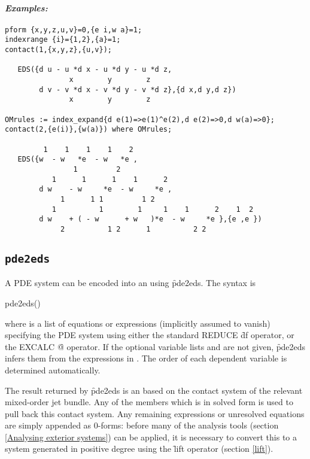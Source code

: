 \paragraph{\it Examples:}
\begin{verbatim}
pform {x,y,z,u,v}=0,{e i,w a}=1;
indexrange {i}={1,2},{a}=1;
contact(1,{x,y,z},{u,v});

   EDS({d u - u *d x - u *d y - u *d z,
               x        y        z 
        d v - v *d x - v *d y - v *d z},{d x,d y,d z})
               x        y        z 

OMrules := index_expand{d e(1)=>e(1)^e(2),d e(2)=>0,d w(a)=>0}; 
contact(2,{e(i)},{w(a)}) where OMrules;

         1    1    1    1    2
   EDS({w  - w   *e  - w   *e ,
                1         2 
           1      1      1    1      2
        d w    - w     *e  - w     *e ,
             1      1 1         1 2 
           1          1        1     1    1      2    1  2
        d w    + ( - w      + w   )*e  - w     *e },{e ,e })
             2          1 2      1          2 2 
\end{verbatim}

\subsection{\tt pde2eds}
\label{pde2eds}

A PDE system can be encoded into an  using \f{pde2eds}. The
syntax is
\begin{syntax}
	pde2eds()
\end{syntax}
where  is a list of equations or expressions (implicitly assumed
to vanish) specifying the PDE system using either
the standard REDUCE \f{df} operator, or the EXCALC \f{@} operator. If the
optional variable lists  and  are not
given, \f{pde2eds} infers them from the expressions in . The
order of each dependent variable is determined automatically.

The result returned by \f{pde2eds} is an  based on the contact
system of the relevant mixed-order jet bundle. Any of the 
members which is in solved form is used to pull back this contact
system. Any remaining expressions or unresolved equations are simply
appended as 0-forms: before many of the analysis tools (section
\ref{Analysing exterior systems}) can be applied, it is necessary to
convert this to a system generated in positive degree using the \f{lift}
operator (section \ref{lift}).

